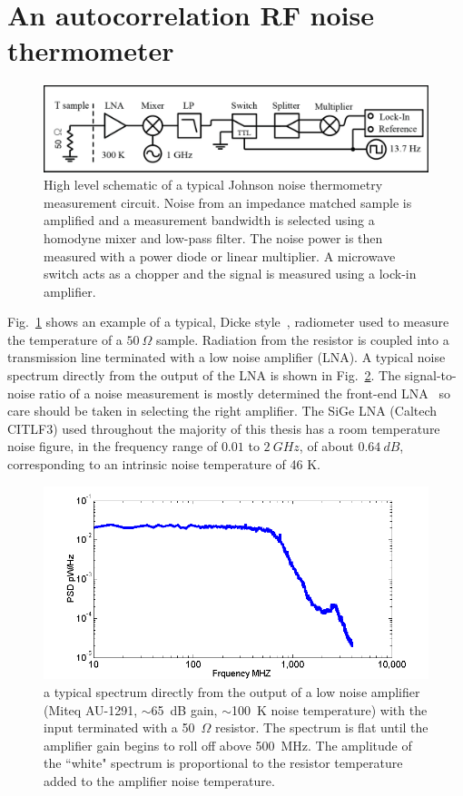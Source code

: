 \section{An autocorrelation RF noise thermometer}
\begin{figure}
\centering
\includegraphics[width=\textwidth]{figures/Johnson_noise_thermometry/Schematic_Autocorrelation.png}
\caption[JNT autocorrelation schematic]{High level schematic of a typical Johnson noise thermometry measurement circuit. Noise from an impedance matched sample is amplified and a measurement bandwidth is selected using a homodyne mixer and low-pass filter. The noise power is then measured with a power diode or linear multiplier. A microwave switch acts as a chopper and the signal is measured using a lock-in amplifier.}
\label{fig:schematic_autocorrelation}
\end{figure}

Fig.~\ref{fig:schematic_autocorrelation} shows an example of a typical, Dicke style~\cite{dicke_measurement_1946}, radiometer used to measure the temperature of a $50~\Omega$ sample. Radiation from the resistor is coupled into a transmission line terminated with a low noise amplifier (LNA). A typical noise spectrum directly from the output of the LNA is shown in Fig.~\ref{fig:Miteq_spec}. The signal-to-noise ratio of a noise measurement is mostly determined the front-end LNA~\cite{pozar_microwave_2011} so care should be taken in selecting the right amplifier. The SiGe LNA (Caltech CITLF3) used throughout the majority of this thesis has a room temperature noise figure, in the frequency range of $0.01$ to $2~GHz$, of about $0.64~dB$, corresponding to an intrinsic noise temperature of 46 K.
\begin{figure}
\includegraphics[width=\textwidth]{figures/Johnson_noise_thermometry/Miteq_spec.png}
\caption{a typical spectrum directly from the output of a low noise amplifier (Miteq AU-1291, $\sim$65~dB gain, $\sim$100~K noise temperature) with the input terminated with a 50~$\Omega$ resistor. The spectrum is flat until the amplifier gain begins to roll off above 500~MHz. The amplitude of the ``white" spectrum is proportional to the resistor temperature added to the amplifier noise temperature.}
\label{fig:Miteq_spec}
\end{figure}

